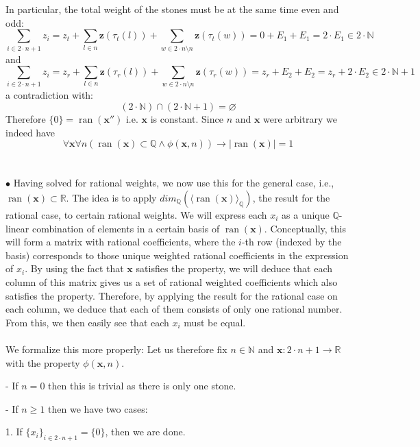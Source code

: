 \documentclass[11pt, a4paper, oneside]{article}
\theoremstyle{remark}
\theoremstyle{lemma}
\begin{document}
In particular, the total weight of the stones must be at the same time even and odd:
$$
\sum_{i \in 2 \cdot n + 1} z_i = z_t + \sum_{l \in n} \mathbf{z}(\tau_t(l)) + \sum_{w \in 2 \cdot n \setminus n} \mathbf{z}(\tau_t(w)) = 0 + E_1 + E_1 = 2 \cdot E_1 \in 2 \cdot \mathbb{N}
$$
and
$$
\sum_{i \in 2 \cdot n + 1} z_i = z_r + \sum_{l \in n} \mathbf{z}(\tau_r(l)) + \sum_{w \in 2 \cdot n \setminus n} \mathbf{z}(\tau_r(w)) = z_r + E_2 + E_2 = z_r + 2 \cdot E_2 \in 2 \cdot \mathbb{N} + 1
$$
a contradiction with:
$$
\left(2 \cdot \mathbb{N}\right) \cap \left(2 \cdot \mathbb{N} + 1\right) = \varnothing
$$
Therefore $\{0\}=\operatorname{ran}(\textbf{x}'')$ i.e. $\textbf{x}$ is constant. Since $n$ and $\textbf{x}$ were arbitrary we indeed have $$\forall \textbf{x} \forall n \left( \operatorname{ran}(\textbf{x}) \subset \mathbb{Q} \wedge \phi(\textbf{x}, n) \right) \rightarrow |\operatorname{ran}(\textbf{x})| = 1$$
\\\\
$\bullet$ Having solved for rational weights, we now use this for the general case, i.e., $\operatorname{ran}(\textbf{x}) \subset \mathbb{R}$. The idea is to apply $dim_{\mathbb{Q}}(\langle \operatorname{ran}(\textbf{x}) \rangle_{\mathbb{Q}})$, the result for the rational case, to certain rational weights. We will express each $x_i$ as a unique $\mathbb{Q}$-linear combination of elements in a certain basis of $\operatorname{ran}(\textbf{x})$. Conceptually, this will form a matrix with rational coefficients, where the $i$-th row (indexed by the basis) corresponds to those unique weighted rational coefficients in the expression of $x_i$. By using the fact that $\textbf{x}$ satisfies the property, we will deduce that each column of this matrix gives us a set of rational weighted coefficients which also satisfies the property. Therefore, by applying the result for the rational case on each column, we deduce that each of them consists of only one rational number. From this, we then easily see that each $x_i$ must be equal. 
\\\\
We formalize this more properly: Let us therefore fix $n \in \mathbb{N}$ and $\mathbf{x}: 2 \cdot n + 1 \to \mathbb{R}$ with the property $\phi(\mathbf{x}, n)$.

- If $n = 0$ then this is trivial as there is only one stone.

- If $n \geq 1$ then we have two cases:

1. If $\{x_i\}_{i \in 2 \cdot n + 1} = \{0\}$, then we are done.
\end{document}
